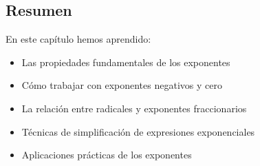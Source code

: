 \begin{teoria}
\section{Resumen}

En este capítulo hemos aprendido:
\begin{itemize}
\item Las propiedades fundamentales de los exponentes
\item Cómo trabajar con exponentes negativos y cero
\item La relación entre radicales y exponentes fraccionarios
\item Técnicas de simplificación de expresiones exponenciales
\item Aplicaciones prácticas de los exponentes
\end{itemize}

\end{teoria}
